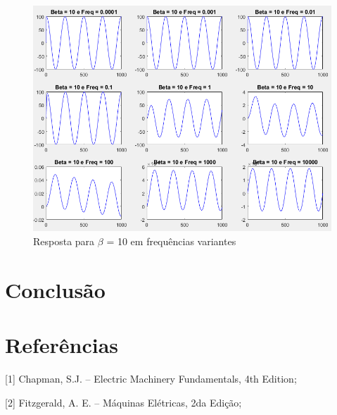 \documentclass[a4paper, 12pt]{article}
\begin{document}
			\begin{figure}[!ht]
				\centering
				\includegraphics[scale=0.52]{img/3k_beta5.png}
				\caption{Resposta para $\beta$ = 10 em frequências variantes}	
			\end{figure}	
	\section{Conclusão}
		
	\newpage
	\section{Referências}
	
	[1] Chapman, S.J. -- Electric Machinery Fundamentals, 4th Edition;
	
	[2] Fitzgerald, A. E. -- Máquinas Elétricas, 2da Edição;
	
\end{document}
